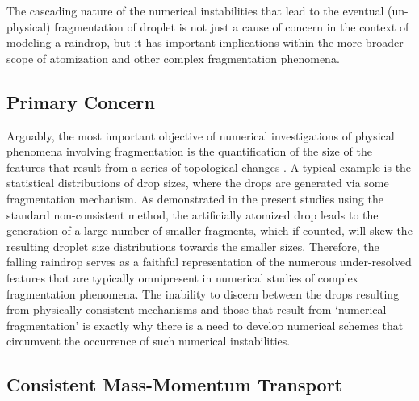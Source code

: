 The cascading nature of the numerical instabilities that lead to 
the eventual (un-physical) fragmentation of droplet is not just a 
cause of concern in the context of modeling a raindrop, but it has important
implications within the more broader scope of 
atomization and other complex fragmentation phenomena. 


\subsection*{Primary Concern}
Arguably, the most important objective of numerical investigations of physical
phenomena involving fragmentation is the quantification of the size of 
the features that result from a series of topological changes 
. 
A typical example is the statistical distributions of drop sizes, 
where the drops are generated via some fragmentation mechanism. 
As demonstrated in the present studies using the standard non-consistent method,  
the artificially atomized drop leads to the generation of a large number of 
smaller fragments, which if counted, will skew the resulting droplet size 
distributions towards the smaller sizes.
Therefore, the falling raindrop serves as a faithful representation of the 
numerous under-resolved features that are typically omnipresent in
numerical studies of complex fragmentation phenomena.  
The inability to discern between the drops resulting from physically consistent 
mechanisms and those that result from `numerical fragmentation' is exactly
why there is a need to develop numerical schemes that circumvent the occurrence
of such numerical instabilities.  



\subsection*{Consistent Mass-Momentum Transport}

